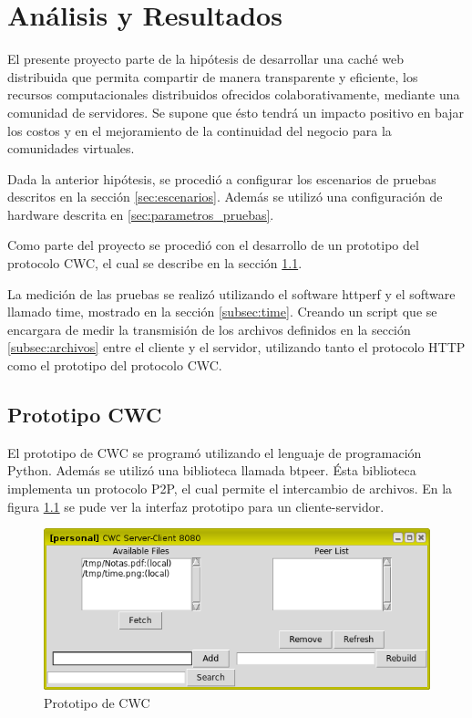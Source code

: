 
\chapter{Análisis y Resultados} %
\label{ch:analisis_resutados} %

El presente proyecto parte de la hipótesis de desarrollar una caché web distribuida que permita compartir de manera transparente y eficiente, los recursos computacionales distribuidos ofrecidos colaborativamente, mediante una comunidad de servidores. Se supone que ésto tendrá un impacto positivo en bajar los costos y en el mejoramiento de la continuidad del negocio para la comunidades virtuales. 

Dada la anterior hipótesis, se procedió a configurar los escenarios de pruebas descritos en la sección \ref{sec:escenarios}. Además se utilizó una configuración de hardware descrita en \ref{sec:parametros_pruebas}.

Como parte del proyecto se procedió con el desarrollo de un prototipo del protocolo CWC, el cual se describe en la sección \ref{sec:protitipo_cwc}.

La medición de las pruebas se realizó utilizando el software httperf y el software llamado time, mostrado en la sección \ref{subsec:time}. Creando un script que se encargara de medir la transmisión de los archivos definidos en la sección \ref{subsec:archivos} entre el cliente y el servidor, utilizando tanto el protocolo HTTP como el prototipo del protocolo CWC. 

\section{Prototipo CWC}
\label{sec:protitipo_cwc}

El prototipo de CWC se programó utilizando el lenguaje de programación Python. Además se utilizó una biblioteca llamada btpeer. Ésta biblioteca implementa un protocolo P2P, el cual permite el intercambio de archivos. En la figura \ref{cwc} se pude ver la interfaz prototipo para un cliente-servidor.

\begin{figure}[h]
  \centering
    \includegraphics[scale=0.75]{gfx/cwc}
  \caption{Prototipo de CWC}
  \label{cwc}
\end{figure}

